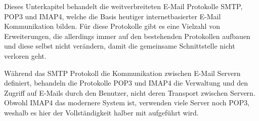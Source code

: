 Dieses Unterkapitel behandelt die weitverbreiteten E-Mail Protokolle SMTP, POP3 und IMAP4, welche die Basis heutiger internetbasierter E-Mail Kommunikation bilden. Für diese Protokolle gibt es eine Vielzahl von Erweiterungen, die allerdings immer auf den bestehenden Protokollen aufbauen und diese selbst nicht verändern, damit die gemeinsame Schnittstelle nicht verloren geht.

Während das SMTP Protokoll die Kommunikation zwischen E-Mail Servern definiert, behandeln die Protokolle POP3 und IMAP4 die Verwaltung und den Zugriff auf E-Mails durch den Benutzer, nicht deren Transport zwischen Servern. Obwohl IMAP4 das modernere System ist,
verwenden viele Server noch POP3,
weshalb es hier der Vollständigkeit halber mit aufgeführt wird.